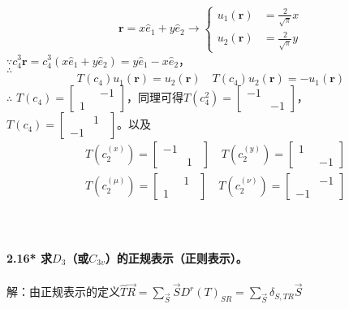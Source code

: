 \documentclass[12pt]{article}
\numberwithin{equation}{section}	 %
\begin{document}
\begin{spacing}{1.5}
\begin{equation}
\bm{r} = x\hat{e}_{1}+y\hat{e}_{2} \longrightarrow \left\{ \begin{aligned}
u_{1}(\bm{r}) &= \frac{2}{\sqrt{\pi}}x \\
u_{2}(\bm{r}) &= \frac{2}{\sqrt{\pi}}y
\end{aligned} \right.
\end{equation}
$\because \displaystyle c_{4}^{3}\bm{r} = c_{4}^{3}\left(x\hat{e}_{1}+y\hat{e}_{2}\right) = y\hat{e}_{1}-x\hat{e}_{2}$，\\
$\therefore$
\begin{equation}
T(c_{4}) u_{1}(\bm{r}) = u_{2}(\bm{r}) \quad T(c_{4}) u_{2}(\bm{r}) = -u_{1}(\bm{r})
\end{equation}
$\therefore$ $T(c_{4}) = \begin{bmatrix} \quad & -1 \\ 1 & \quad \end{bmatrix}$，同理可得$T(c_{4}^{2}) = \begin{bmatrix} -1 & \quad \\ \quad & -1 \end{bmatrix}$，$T(c_{4}) = \begin{bmatrix} \quad & 1 \\ -1 & \quad \end{bmatrix}$。以及	
\begin{align*}
&T(c_{2}^{(x)}) = \begin{bmatrix} -1 & \quad \\ \quad & 1 \end{bmatrix} \quad T(c_{2}^{(y)}) = \begin{bmatrix} 1 & \quad \\ \quad & -1 \end{bmatrix} \\
&T(c_{2}^{(\mu)}) = \begin{bmatrix} \quad & 1 \\ 1 & \quad \end{bmatrix} \quad T(c_{2}^{(\nu)}) = \begin{bmatrix} \quad & -1 \\ -1 & \quad \end{bmatrix}
\end{align*}
~\\
~\\
~\\
\textbf{2.16* \quad 求$D_{3}$（或$C_{3v}$）的正规表示（正则表示）。}\\
~\\
解：由正规表示的定义$\displaystyle \hat{T}\vec{R} = \sum_{\vec{S}}\vec{S}D^{r}(T)_{SR} = \sum_{\vec{S}}\delta_{S,TR}\vec{S}$\\

\end{spacing}
\end{document}
